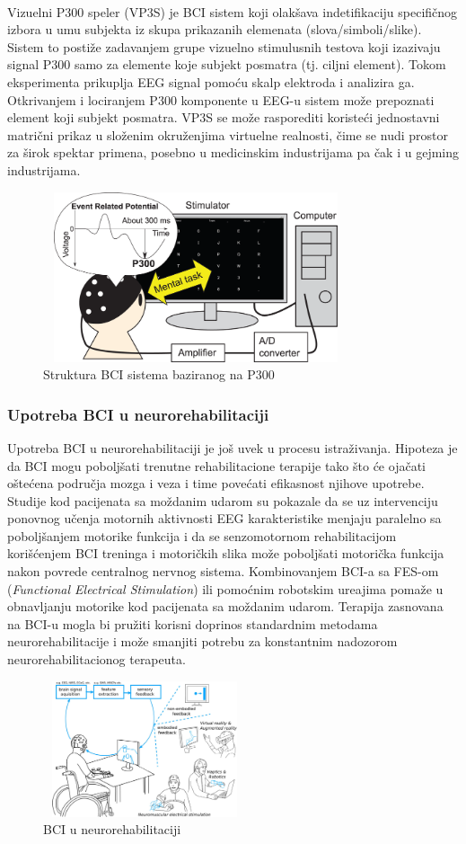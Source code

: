 \documentclass[conference]{IEEEtran}
\begin{document}
\\
Vizuelni P300 speler (VP3S) je BCI sistem koji olakšava indetifikaciju specifičnog izbora u umu subjekta iz skupa prikazanih elemenata (slova/simboli/slike). Sistem to postiže zadavanjem grupe vizuelno stimulusnih testova koji izazivaju signal P300 samo za elemente koje subjekt posmatra (tj. ciljni element). Tokom eksperimenta prikuplja EEG signal pomoću skalp elektroda i analizira ga. Otkrivanjem i lociranjem P300 komponente u EEG-u sistem može prepoznati element koji subjekt posmatra. VP3S se može rasporediti koristeći jednostavni matrični prikaz u složenim okruženjima virtuelne realnosti, čime se nudi prostor za širok spektar primena, posebno u medicinskim industrijama pa čak i u gejming industrijama.
\begin{figure}[htp]
\centerline{\includegraphics[width=9cm, height=5cm]{Structure-of-the-P300-based-BCI-system-A-target-letter-is-presented-to-a-participant.png}}
\caption{Struktura BCI sistema baziranog na P300}
\label{Slika}
\end{figure}
\subsubsection{Upotreba BCI u neurorehabilitaciji}
Upotreba BCI u neurorehabilitaciji je još uvek u procesu istraživanja. Hipoteza je da BCI mogu poboljšati trenutne rehabilitacione terapije tako što će ojačati oštećena područja mozga i veza i time povećati efikasnost njihove upotrebe. Studije kod pacijenata sa moždanim udarom su pokazale da se uz intervenciju ponovnog učenja motornih aktivnosti EEG karakteristike menjaju paralelno sa poboljšanjem motorike funkcija i da se senzomotornom rehabilitacijom korišćenjem BCI treninga i motoričkih slika može poboljšati motorička funkcija nakon povrede centralnog nervnog sistema. Kombinovanjem BCI-a sa FES-om (\textit{Functional Electrical Stimulation}) ili pomoćnim robotskim ure\dj ajima pomaže u obnavljanju motorike kod pacijenata sa moždanim udarom. Terapija zasnovana na BCI-u mogla bi pružiti korisni doprinos standardnim metodama neurorehabilitacije i može smanjiti potrebu za konstantnim nadozorom neurorehabilitacionog terapeuta.
\begin{figure}[htp]
\centerline{\includegraphics[width=6cm, height=4cm]{DZMaDzTWkAAdKzh.jpg}}
\caption{BCI u neurorehabilitaciji}
\label{Slika}
\end{figure}
\end{document}
